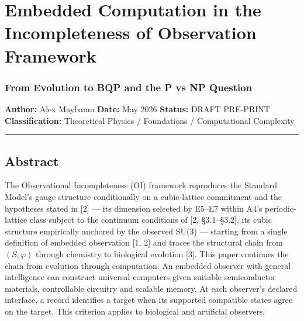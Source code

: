 \documentclass[
]{article}
\author{}
\date{}
\begin{document}
\hypertarget{embedded-computation-in-the-incompleteness-of-observation-framework}{%
\section{Embedded Computation in the Incompleteness of Observation
Framework}\label{embedded-computation-in-the-incompleteness-of-observation-framework}}

\hypertarget{from-evolution-to-bqp-and-the-p-vs-np-question}{%
\subsubsection{From Evolution to BQP and the P vs NP
Question}\label{from-evolution-to-bqp-and-the-p-vs-np-question}}

\textbf{Author:} Alex Maybaum \textbf{Date:} May 2026 \textbf{Status:}
DRAFT PRE-PRINT \textbf{Classification:} Theoretical Physics /
Foundations / Computational Complexity

\begin{center}\rule{0.5\linewidth}{0.5pt}\end{center}

\hypertarget{abstract}{%
\subsection{Abstract}\label{abstract}}

The Observational Incompleteness (OI) framework reproduces the Standard
Model's gauge structure conditionally on a cubic-lattice commitment and
the hypotheses stated in {[}2{]} --- its dimension selected by E5--E7
within A4's periodic-lattice class subject to the continuum conditions
of {[}2, §3.1--§3.2{]}, its cubic structure empirically anchored by the
observed SU(3) --- starting from a single definition of embedded
observation {[}1, 2{]} and traces the structural chain from
\((S, \varphi)\) through chemistry to biological evolution {[}3{]}. This
paper continues the chain from evolution through computation. An
embedded observer with general intelligence can construct universal
computers given suitable semiconductor materials, controllable circuitry
and scalable memory. At each observer's declared interface, a record
identifies a target when its supported compatible states agree on the
target. This criterion applies to biological and artificial observers.
\end{document}
